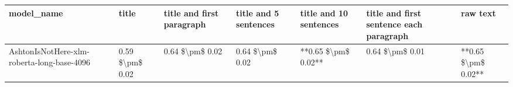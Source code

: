 \begin{tabular}{lllllll}
\toprule
                                model\_name &           title & title and first paragraph & title and 5 sentences & title and 10 sentences & title and first sentence each paragraph &            raw text \\
\midrule
AshtonIsNotHere-xlm-roberta-long-base-4096 & 0.59 \$\textbackslash pm\$ 0.02 &           0.64 \$\textbackslash pm\$ 0.02 &       0.64 \$\textbackslash pm\$ 0.02 &    **0.65 \$\textbackslash pm\$ 0.02** &                         0.64 \$\textbackslash pm\$ 0.01 & **0.65 \$\textbackslash pm\$ 0.02** \\
\bottomrule
\end{tabular}
